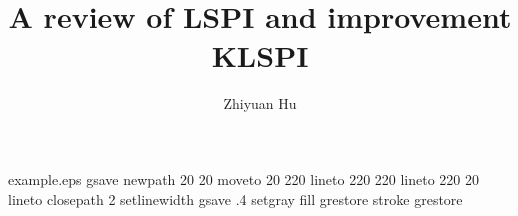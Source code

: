 %
%
%
%
%
\begin{filecontents*}{example.eps}
gsave
newpath
  20 20 moveto
  20 220 lineto
  220 220 lineto
  220 20 lineto
closepath
2 setlinewidth
gsave
  .4 setgray fill
grestore
stroke
grestore
\end{filecontents*}
%
\RequirePackage{fix-cm}
%
\documentclass[smallextended]{svjour3}       %
%
\smartqed  %
%
\usepackage{graphicx}
\usepackage{xcolor} %
\usepackage{amsfonts} %
\usepackage{amsmath}
\usepackage{algorithm}
\usepackage{algorithmic}
\usepackage{multicol}
\usepackage{frame}
\usepackage{wrapfig}
%
%
%
%
%


\title{A review of LSPI and improvement KLSPI%
}


\author{Zhiyuan Hu         
}

